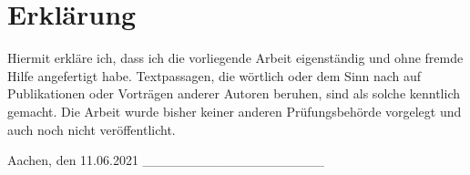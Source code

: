 \hypertarget{erkluxe4rung}{%
\section{Erklärung}\label{erkluxe4rung}}

Hiermit erkläre ich, dass ich die vorliegende Arbeit eigenständig und
ohne fremde Hilfe angefertigt habe. Textpassagen, die wörtlich oder dem
Sinn nach auf Publikationen oder Vorträgen anderer Autoren beruhen, sind
als solche kenntlich gemacht. Die Arbeit wurde bisher keiner anderen
Prüfungsbehörde vorgelegt und auch noch nicht veröffentlicht. 

Aachen, den 11.06.2021 \_\_\_\_\_\_\_\_\_\_\_\_\_\_\_\_\_\_\_
